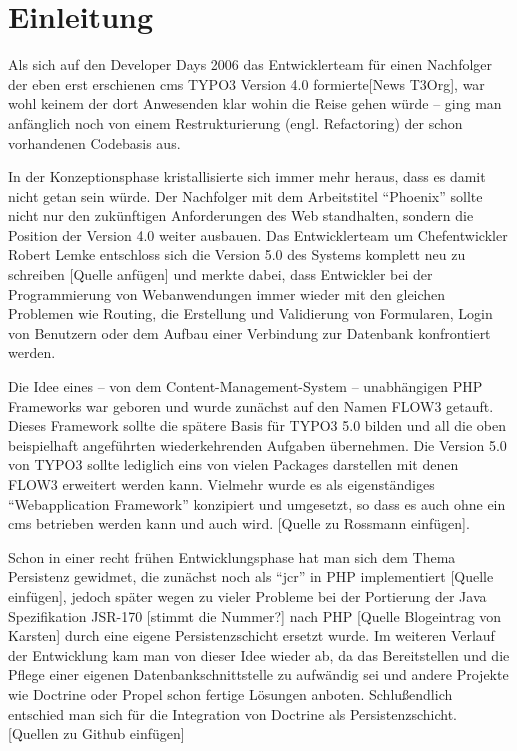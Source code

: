 \chapter{Einleitung}
\label{ch:intro}
Als sich auf den Developer Days 2006 das Entwicklerteam für einen Nachfolger der eben erst erschienen \gls{cms} TYPO3 Version 4.0 formierte[News T3Org], war wohl keinem der dort Anwesenden klar wohin die Reise gehen würde – ging man anfänglich noch von einem Restrukturierung (engl. Refactoring) der schon vorhandenen Codebasis aus.

In der Konzeptionsphase kristallisierte sich immer mehr heraus, dass es damit nicht getan sein würde. Der Nachfolger mit dem Arbeitstitel ``Phoenix'' sollte nicht nur den zukünftigen Anforderungen des Web standhalten, sondern die Position der Version 4.0 weiter ausbauen. Das Entwicklerteam um Chefentwickler Robert Lemke entschloss sich die Version 5.0 des Systems komplett neu zu schreiben [Quelle anfügen] und merkte dabei, dass Entwickler bei der Programmierung von Webanwendungen immer wieder mit den gleichen Problemen wie Routing, die Erstellung und Validierung von Formularen, Login von Benutzern oder dem Aufbau einer Verbindung zur Datenbank konfrontiert werden.

Die Idee eines – von dem Content-Management-System – unabhängigen PHP Frameworks war geboren und wurde zunächst auf den Namen FLOW3 getauft. Dieses Framework sollte die spätere Basis für TYPO3 5.0 bilden und all die oben beispielhaft angeführten wiederkehrenden Aufgaben übernehmen. Die Version 5.0 von TYPO3 sollte lediglich eins von vielen Packages darstellen mit denen FLOW3 erweitert werden kann. Vielmehr wurde es als eigenständiges ``Webapplication Framework'' konzipiert und umgesetzt, so dass es auch ohne ein \gls{cms} betrieben werden kann und auch wird. [Quelle zu Rossmann einfügen].

Schon in einer recht frühen Entwicklungsphase hat man sich dem Thema Persistenz gewidmet, die zunächst noch als ``\gls{jcr}'' in PHP implementiert [Quelle einfügen], jedoch später wegen zu vieler Probleme bei der Portierung der Java Spezifikation JSR-170 [stimmt die Nummer?] nach PHP [Quelle Blogeintrag von Karsten] durch eine eigene Persistenzschicht ersetzt wurde. Im weiteren Verlauf der Entwicklung kam man von dieser Idee wieder ab, da das Bereitstellen und die Pflege einer eigenen Datenbankschnittstelle zu aufwändig sei und andere Projekte wie Doctrine oder Propel schon fertige Lösungen anboten. Schlußendlich entschied man sich für die Integration von Doctrine als Persistenzschicht. [Quellen zu Github einfügen]

